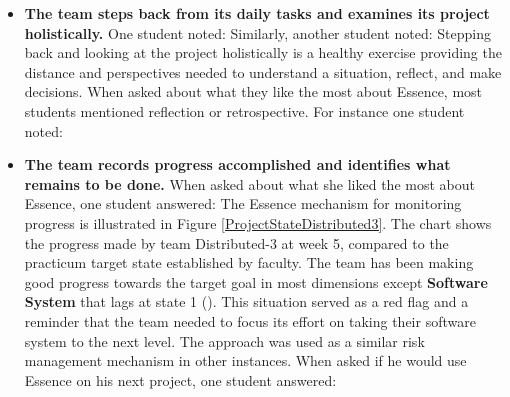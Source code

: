\begin{itemize}
    \item \textbf{The team steps back from its daily tasks and examines its project holistically.} One student noted:  Similarly, another student noted:  Stepping back and looking at the project holistically is a healthy exercise providing the distance and perspectives needed to understand a situation, reflect, and make decisions. When asked about what they like the most about Essence, most students mentioned reflection or retrospective. For instance one student noted: 
    
    \item \textbf{The team records progress accomplished and identifies what remains to be done.} When asked about what she liked the most about Essence, one student answered:  The Essence mechanism for monitoring progress is illustrated in Figure \ref{ProjectStateDistributed3}. The chart shows the progress made by team Distributed-3 at week 5, compared to the practicum target state established by faculty. The team has been making good progress towards the target goal in most dimensions except \textbf{Software System} that lags at state 1 (). This situation served as a red flag and a reminder that the team needed to focus its effort on taking their software system to the next level. The approach was used as a similar risk management mechanism in other instances. When asked if he would use Essence on his next project, one student answered: 
    

\end{itemize}
